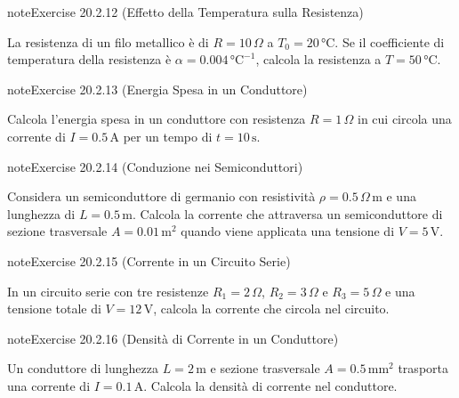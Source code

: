 \documentclass[letterpaper,10pt,italian]{jupyterBook}
\begin{document}
\begin{sphinxadmonition}{note}{Exercise 20.2.12 (Effetto della Temperatura sulla Resistenza)}



\sphinxAtStartPar
La resistenza di un filo metallico è di \(R = 10 \, \Omega\) a \(T_0 = 20 \, \text{°C}\). Se il coefficiente di temperatura della resistenza è \(\alpha = 0.004 \, \text{°C}^{-1}\), calcola la resistenza a \(T = 50 \, \text{°C}\).
\end{sphinxadmonition}
 \label{exercise:ch/electromagnetism/electric-current-problems-exercise-12}

\begin{sphinxadmonition}{note}{Exercise 20.2.13 (Energia Spesa in un Conduttore)}



\sphinxAtStartPar
Calcola l’energia spesa in un conduttore con resistenza \(R = 1 \, \Omega\) in cui circola una corrente di \(I = 0.5 \, \text{A}\) per un tempo di \(t = 10 \, \text{s}\).
\end{sphinxadmonition}
 \label{exercise:ch/electromagnetism/electric-current-problems-exercise-13}

\begin{sphinxadmonition}{note}{Exercise 20.2.14 (Conduzione nei Semiconduttori)}



\sphinxAtStartPar
Considera un semiconduttore di germanio con resistività \(\rho = 0.5 \, \Omega \, \text{m}\) e una lunghezza di \(L = 0.5 \, \text{m}\). Calcola la corrente che attraversa un semiconduttore di sezione trasversale \(A = 0.01 \, \text{m}^2\) quando viene applicata una tensione di \(V = 5 \, \text{V}\).
\end{sphinxadmonition}
 \label{exercise:ch/electromagnetism/electric-current-problems-exercise-14}

\begin{sphinxadmonition}{note}{Exercise 20.2.15 (Corrente in un Circuito Serie)}



\sphinxAtStartPar
In un circuito serie con tre resistenze \(R_1 = 2 \, \Omega\), \(R_2 = 3 \, \Omega\) e \(R_3 = 5 \, \Omega\) e una tensione totale di \(V = 12 \, \text{V}\), calcola la corrente che circola nel circuito.
\end{sphinxadmonition}
 \label{exercise:ch/electromagnetism/electric-current-problems-exercise-15}

\begin{sphinxadmonition}{note}{Exercise 20.2.16 (Densità di Corrente in un Conduttore)}



\sphinxAtStartPar
Un conduttore di lunghezza \(L = 2 \, \text{m}\) e sezione trasversale \(A = 0.5 \, \text{mm}^2\) trasporta una corrente di \(I = 0.1 \, \text{A}\). Calcola la densità di corrente nel conduttore.
\end{sphinxadmonition}
 \label{exercise:ch/electromagnetism/electric-current-problems-exercise-16}
\end{document}
